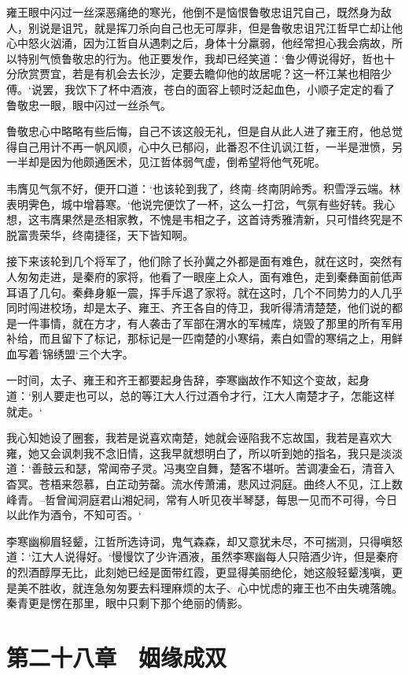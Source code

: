 雍王眼中闪过一丝深恶痛绝的寒光，他倒不是恼恨鲁敬忠诅咒自己，既然身为敌人，别说是诅咒，就是挥刀杀向自己也无可厚非，但是鲁敬忠诅咒江哲早亡却让他心中怒火汹涌，因为江哲自从遇刺之后，身体十分羸弱，他经常担心我会病故，所以特别气愤鲁敬忠的行为。他正要发作，我却已经笑道：‘鲁少傅说得好，哲也十分欣赏贾宜，若是有机会去长沙，定要去瞻仰他的故居呢？这一杯江某也相陪少傅。‘说罢，我饮下了杯中酒液，苍白的面容上顿时泛起血色，小顺子定定的看了鲁敬忠一眼，眼中闪过一丝杀气。

鲁敬忠心中略略有些后悔，自己不该这般无礼，但是自从此人进了雍王府，他总觉得自己用计不再一帆风顺，心中久已郁闷，此番忍不住讥讽江哲，一半是泄愤，另一半却是因为他颇通医术，见江哲体弱气虚，倒希望将他气死呢。

韦膺见气氛不好，便开口道：‘也该轮到我了，终南--终南阴岭秀。积雪浮云端。林表明霁色，城中增暮寒。‘他说完便饮了一杯，这么一打岔，气氛有些好转。我心想，这韦膺果然是丞相家教，不愧是韦相之子，这首诗秀雅清新，只可惜终究是不脱富贵荣华，终南捷径，天下皆知啊。

接下来该轮到几个将军了，他们除了长孙冀之外都是面有难色，就在这时，突然有人匆匆走进，是秦府的家将，他看了一眼座上众人，面有难色，走到秦彝面前低声耳语了几句。秦彝身躯一震，挥手斥退了家将。就在这时，几个不同势力的人几乎同时闯进校场，却是太子、雍王、齐王各自的侍卫，我听得清清楚楚，他们说的都是一件事情，就在方才，有人袭击了军部在渭水的军械库，烧毁了那里的所有军用补给，而且留下了标记，那标记是一匹南楚的小寒绢，素白如雪的寒绢之上，用鲜血写着‘锦绣盟‘三个大字。

一时间，太子、雍王和齐王都要起身告辞，李寒幽故作不知这个变故，起身道：‘别人要走也可以，总的等江大人行过酒令才行，江大人南楚才子，怎能这样就走。‘

我心知她设了圈套，我若是说喜欢南楚，她就会诬陷我不忘故国，我若是喜欢大雍，她又会讽刺我不念旧情，这我早就想明白了，所以听到她的指名，我只是淡淡道：‘善鼓云和瑟，常闻帝子灵。冯夷空自舞，楚客不堪听。苦调凄金石，清音入杳冥。苍梧来怨慕，白芷动劳罄。流水传萧浦，悲风过洞庭。曲终人不见，江上数峰青。--哲曾闻洞庭君山湘妃祠，常有人听见夜半琴瑟，每思一见而不可得，今日以此作为酒令，不知可否。‘

李寒幽柳眉轻颦，江哲所选诗词，鬼气森森，却又意犹未尽，不可揣测，只得嗔怒道：‘江大人说得好。‘慢慢饮了少许酒液，虽然李寒幽每人只陪酒少许，但是秦府的烈酒醇厚无比，此刻她已经是面带红霞，更显得美丽绝伦，她这般轻颦浅嗔，更是美不胜收，就连急匆匆要去料理麻烦的太子、心中忧虑的雍王也不由失魂落魄。秦青更是愣在那里，眼中只剩下那个绝丽的倩影。

\chapter{第二十八章　姻缘成双}

